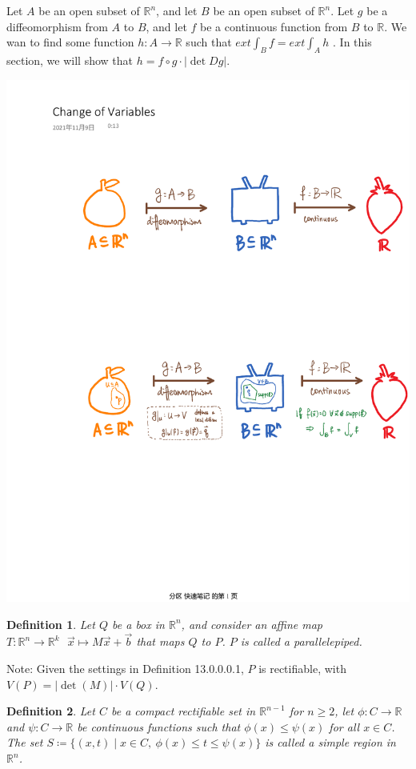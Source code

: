 \documentclass[11pt,oneside]{book}
\theoremstyle{break}
\theoremstyle{break}
\newtheorem{defn}{Definition}[corL]
\newcommand{\R}{\mathbb{R}}
\newcommand{\note}{\color{red}Note: \color{black}}
\begin{document}
Let $A$ be an open subset of $\R^n$, and let $B$ be an open subset of $\R^n$. Let $g$ be a diffeomorphism from $A$ to $B$, and let $f$ be a continuous function from $B$ to $\R$. We wan to find some function $h:A \to \R$ such that $ext \int_B f = ext \int_A h$ . In this section, we will show that $h = f\circ g \cdot |\det Dg|$.\\
\begin{center}
\includegraphics[scale=0.69]{chngOfVar.pdf}
\end{center}

\begin{defn}
Let $Q$ be a box in $\R^n$, and consider an affine map $T:\R^n \to \R^k \ \ \ \vec{x}\mapsto M\vec{x}+\vec{b}$ that maps $Q$ to $P$. $P$ is called a parallelepiped.  
\end{defn}
\note Given the settings in Definition 13.0.0.0.1, $P$ is rectifiable, with $V(P) = |\det(M)| \cdot V(Q)$.

\begin{defn}
Let $C$ be a compact rectifiable set in $\R^{n-1}$ for $n \geq 2$, let $\phi:C \to \R$ and $\psi:C \to \R$ be continuous functions such that $\phi(x) \leq \psi(x)$ for all $x \in C$. The set $S\coloneqq \{(x,t) \mid x \in C,\ \phi(x) \leq t \leq \psi(x)\}$ is called a simple region in $\R^n$. 
\end{defn}
\end{document}
